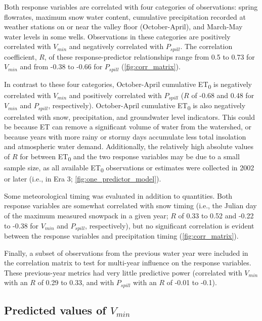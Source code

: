 \documentclass[hess, manuscript]{copernicus}
\begin{document}
Both response variables are correlated with four categories of
observations: spring flowrates, maximum snow water content, cumulative
precipitation recorded at weather stations on or near the valley floor
(October-April), and March-May water levels in some wells. Observations
in these categories are positively correlated with \(V_{min}\) and
negatively correlated with \(P_{spill}\). The correlation coefficient,
\(R\), of these response-predictor relationships range from 0.5 to 0.73
for \(V_{min}\) and from -0.38 to -0.66 for \(P_{spill}\)
(\autoref{fig:corr_matrix}).

In contrast to these four categories, October-April cumulative
ET\textsubscript{0} is negatively correlated with \(V_{min}\) and
positively correlated with \(P_{spill}\) (\(R\) of -0.68 and 0.48 for
\(V_{min}\) and \(P_{spill}\), respectively). October-April cumulative
ET\textsubscript{0} is also negatively correlated with snow,
precipitation, and groundwater level indicators. This could be because
ET can remove a significant volume of water from the watershed, or
because years with more rainy or stormy days accumulate less total
insolation and atmospheric water demand. Additionally, the relatively
high absolute values of \(R\) for between ET\textsubscript{0} and the
two response variables may be due to a small sample size, as all
available ET\textsubscript{0} observations or estimates were collected
in 2002 or later (i.e., in Era 3; \autoref{fig:one_predictor_model}).

Some meteorological timing was evaluated in addition to quantities. Both
response variables are somewhat correlated with snow timing (i.e., the
Julian day of the maximum measured snowpack in a given year; \(R\) of
0.33 to 0.52 and -0.22 to -0.38 for \(V_{min}\) and \(P_{spill}\),
respectively), but no significant correlation is evident between the
response variables and precipitation timing (\autoref{fig:corr_matrix}).

Finally, a subset of observations from the previous water year were
included in the correlation matrix to test for multi-year influence on
the response variables. These previous-year metrics had very little
predictive power (correlated with \(V_{min}\) with an \(R\) of 0.29 to
0.33, and with \(P_{spill}\) with an \(R\) of -0.01 to -0.1).

\subsection{\texorpdfstring{Predicted values of
\(V_{min}\)}{Predicted values of V\_\{min\}}}
\end{document}
